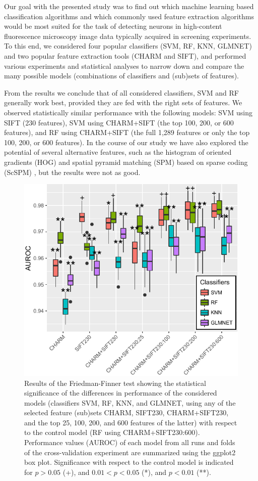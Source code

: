 Our goal with the presented study was to find out which machine learning based classification algorithms and which commonly used feature extraction algorithms would be most suited for the task of detecting neurons in high-content fluorescence microscopy image data typically acquired in screening experiments. To this end, we considered four popular classifiers (SVM, RF, KNN, GLMNET) and two popular feature extraction tools (CHARM and SIFT), and performed various experiments and statistical analyses to narrow down and compare the many possible models (combinations of classifiers and (sub)sets of features).

From the results we conclude that of all considered classifiers, SVM and RF generally work best, provided they are fed with the right sets of features. {\color{red}We observed statistically similar performance with the following models: SVM using SIFT (230 features), SVM using CHARM+SIFT (the top 100, 200, or 600 features), and RF using CHARM+SIFT (the full 1,289 features or only the top 100, 200, or 600 features). In the course of our study we have also explored the potential of several alternative features, such as the histogram of oriented gradients (HOG) \cite{Dalal} and spatial pyramid matching (SPM) \cite{Lazebnik} based on sparse coding (ScSPM) \cite{Yang}, but the results were not as good.}

\begin{figure}
	\centering
	\includegraphics[width=\columnwidth]{fig10}
	\caption{\color{red}Results of the Friedman-Finner test showing the statistical significance of the differences in performance of the considered models (classifiers SVM, RF, KNN, and GLMNET, using any of the selected feature (sub)sets CHARM, SIFT230, CHARM+SIFT230, and the top 25, 100, 200, and 600 features of the latter) with respect to the control model (RF using CHARM+SIFT230:600). Performance values (AUROC) of each model from all runs and folds of the cross-validation experiment are summarized using the ggplot2 box plot. Significance with respect to the control model is indicated for $p > 0.05$ (+), and $0.01 < p < 0.05$ (*), and $p < 0.01$ (**).}
	\label{fig:statisticalSignificance}
\end{figure}

